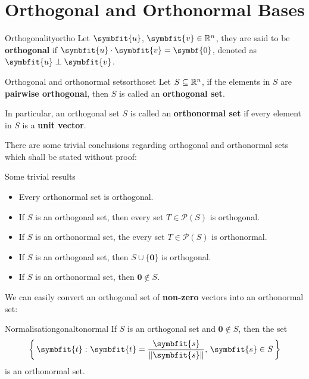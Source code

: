 \documentclass[math]{amznotes}
\theoremstyle{remark}
\begin{document}
\section{Orthogonal and Orthonormal Bases}
\begin{dfnbox}{Orthogonality}{ortho}
    Let $\symbfit{u}$, $\symbfit{v} \in \R^n$, they are said to be {\color{red} \textbf{orthogonal}} if $\symbfit{u} \cdot \symbfit{v} = \symbf{0}$, denoted as $\symbfit{u} \perp \symbfit{v}$.
\end{dfnbox}
\begin{dfnbox}{Orthogonal and orthonormal sets}{orthoset}
    Let $S \subseteq \mathbb{R}^n$, if the elements in $S$ are {\color{red} \textbf{pairwise orthogonal}}, then $S$ is called an {\color{red} \textbf{orthogonal set}}.

    In particular, an orthogonal set $S$ is called an {\color{red} \textbf{orthonormal set}} if every element in $S$ is a {\color{red} \textbf{unit vector}}.
\end{dfnbox}
There are some trivial conclusions regarding orthogonal and orthonormal sets which shall be stated without proof:
\begin{genbox}{Some trivial results}
    \begin{itemize}
        \item Every orthonormal set is orthogonal.
        \item If $S$ is an orthogonal set, then every set $T \in \mathcal{P}\left(S\right)$ is orthogonal.
        \item If $S$ is an orthonormal set, the every set $T \in \mathcal{P}\left(S\right)$ is orthonormal.
        \item If $S$ is an orthogonal set, then $S \cup \{\symbf{0}\}$ is orthogonal.
        \item If $S$ is an orthonormal set, then $\symbf{0} \notin S$.
    \end{itemize}
\end{genbox}
We can easily convert an orthogonal set of {\color{red} \textbf{non-zero}} vectors into an orthonormal set:
\begin{thmbox}{Normalisation}{gonaltonormal}
    If $S$ is an orthogonal set and $\symbf{0} \notin S$, then the set
    \begin{displaymath}
        \left\{\,\symbfit{t} \,\colon \symbfit{t} = \frac{\symbfit{s}}{\left\lVert \symbfit{s} \right\rVert},\, \symbfit{s} \in S \,\right\}
    \end{displaymath}
    is an orthonormal set.
\end{thmbox}
\end{document}

